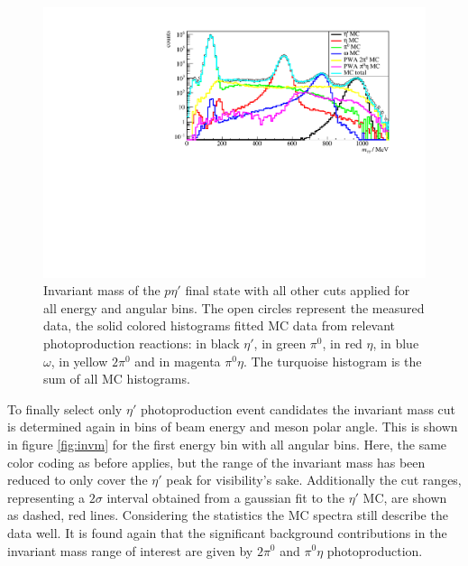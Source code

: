  \begin{figure}[htbp]
	\centering
	\includegraphics[width=\linewidth]{../figs/hydrogen/invm_global.pdf}
	\caption{Invariant mass of the $p\eta'$ final state with all other cuts applied for all energy and angular bins. The open circles represent the measured data, the solid colored histograms fitted MC data from relevant photoproduction reactions: in black $\eta'$, in green $\pi^0$, in red $\eta$, in blue $\omega$, in yellow $2\pi^0$ and in magenta $\pi^0\eta$. The turquoise histogram is the sum of all MC histograms.}
	\label{fig:globalinv}
\end{figure} 
To finally select only $\eta'$ photoproduction event candidates the invariant mass cut is determined again in bins of beam energy and meson polar angle. This is shown in figure \ref{fig:invm} for the first energy bin with all angular bins. Here, the same color coding as before applies, but the range of the invariant mass has been reduced to only cover the $\eta'$ peak for visibility's sake. Additionally the cut ranges, representing a $2\sigma$ interval obtained from a gaussian fit to the $\eta'$ MC, are shown as dashed, red lines. Considering the statistics the MC spectra still describe the data well. It is found again that the significant background contributions in the invariant mass range of interest are given by $2\pi^0$ and $\pi^0\eta$ photoproduction.  
